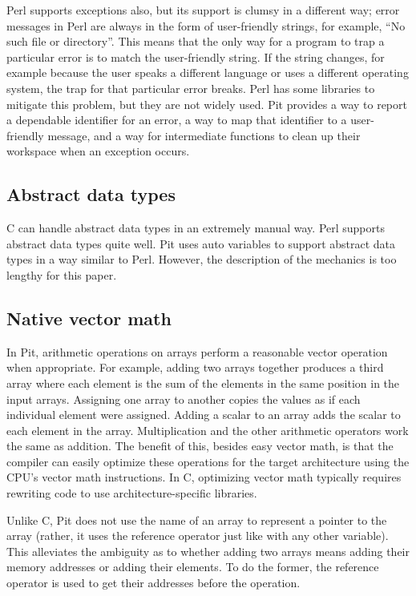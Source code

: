 Perl supports exceptions also, but its support is clumsy in a different way; error messages in Perl are always in the
form of user-friendly strings, for example, ``No such file or directory''.  This means that the only way for a program
to trap a particular error is to match the user-friendly string.  If the string changes, for example because the user
speaks a different language or uses a different operating system, the trap for that particular error breaks.  Perl has
some libraries to mitigate this problem, but they are not widely used.  Pit
provides a way to report a dependable identifier for an error, a way to map that identifier to a user-friendly message,
and a way for intermediate functions to clean up their workspace when an exception occurs.

\subsection{Abstract data types}

C can handle abstract data types in an extremely manual way.  Perl supports abstract data types quite well.  Pit uses
auto variables to support abstract data types in a way similar to Perl.  However, the description of the mechanics is
too lengthy for this paper.

\subsection{Native vector math}

In Pit, arithmetic operations on arrays perform a reasonable vector operation when appropriate.  For example, adding two
arrays together produces a third array where each element is the sum of the elements in the same position in the
input arrays.  Assigning one array to another copies the values as if each individual element were assigned.
Adding a scalar to an array adds the scalar to each element in the array.  Multiplication and the other arithmetic
operators work the same as addition.  The benefit of this, besides easy vector math, is that the compiler can easily
optimize these operations for the target architecture using the CPU's vector math instructions.  In C, optimizing
vector math typically requires rewriting code to use architecture-specific libraries.

Unlike C, Pit does not use the name of an array to represent a pointer to the array (rather, it uses the reference
operator just like with any other variable).  This alleviates the ambiguity as to whether adding two arrays means
adding their memory addresses or adding their elements.  To do the former, the reference operator is used to get their
addresses before the operation.

